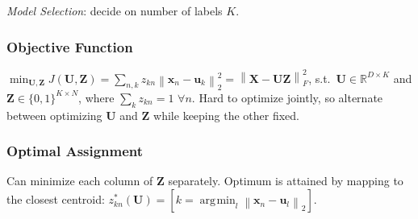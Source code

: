 \documentclass[11pt,a4paper,technote]{IEEEtran}
\DeclareMathOperator*{\argmin}{\arg\!\min}
\newcommand{\iver}[1]{\left[#1\right]}
\newcommand{\norm}[1]{\left\lVert#1\right\rVert}
\newcommand{\matr}[1]{\boldsymbol{\mathbf{#1}}}
\newcommand{\vect}[1]{\boldsymbol{\mathbf{#1}}}
\newcommand{\R}{\mathbb{R}}
\begin{document}
\emph{Model Selection}: decide on number of labels $K$.


\subsubsection*{Objective Function}
\(
  \min_{\matr{U},\matr{Z}} J(\matr{U},\matr{Z}) = \sum_{n,k} z_{kn}
  \norm{\vect{x}_n - \vect{u}_k}_2^2 = \norm{\matr{X} - \matr{U}\matr{Z}}_F^2
\), s.t.\ $\matr{U}\in\R^{D \times K}$ and $\matr{Z}\in{\{0,1\}}^{K\times N}$,
where $\sum_{k} z_{kn} = 1$ $\forall n$. Hard to optimize jointly, so alternate
between optimizing $\matr{U}$ and $\matr{Z}$ while keeping the other fixed.

\subsubsection*{Optimal Assignment}
Can minimize each column of $\matr{Z}$ separately.  Optimum is attained by
mapping to the closest centroid: $z_{kn}^* (\matr{U}) = \iver{k = \argmin_l
  \norm{\vect{x}_n - \vect{u}_l}_2}$.
\end{document}
